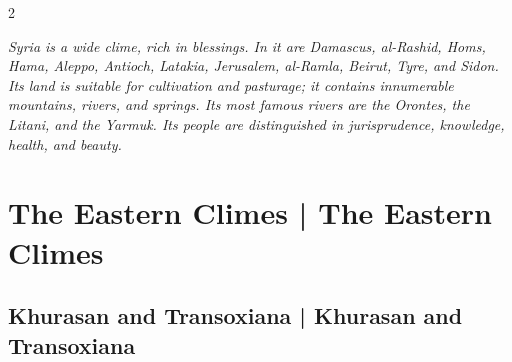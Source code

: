 \documentclass[11pt,a4paper]{article}
\begin{document}
\begin{paracol}{2}

\switchcolumn[0]
\begin{flushright}
{\small\arabicfont
{}}
\end{flushright}

\switchcolumn[1]
\begin{flushleft}
\small
\textit{Syria is a wide clime, rich in blessings. In it are Damascus, al-Rashid, Homs, Hama, Aleppo, Antioch, Latakia, Jerusalem, al-Ramla, Beirut, Tyre, and Sidon. Its land is suitable for cultivation and pasturage; it contains innumerable mountains, rivers, and springs. Its most famous rivers are the Orontes, the Litani, and the Yarmuk. Its people are distinguished in jurisprudence, knowledge, health, and beauty.}
\end{flushleft}

\end{paracol}

\clearpage


\section{The Eastern Climes | The Eastern Climes}

\subsection{Khurasan and Transoxiana | Khurasan and Transoxiana}
\end{document}
